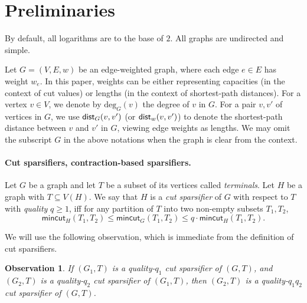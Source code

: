 \documentclass[11pt]{article}
\newtheorem{lemma}[theorem]{Lemma}
\newtheorem{observation}[theorem]{Observation}
\theoremstyle{definition}
\newcommand{\dist}{\textnormal{\textsf{dist}}}
\def\deg{\textrm{deg}}
\def\pr#1{\mathrm{Pr}\left[ #1 \right]}
\def\ex#1{{\mathbb{E}}\left[ #1 \right]}
\newcounter{note}
\newcommand{\mc}{\mathsf{mincut}}
\begin{document}
 

\section{Preliminaries}
\label{sec: prelim}

By default, all logarithms are to the base of $2$. 
All graphs are undirected and simple.

Let $G=(V,E,w)$ be an edge-weighted graph, where each edge $e\in E$ has weight $w_e$. 
In this paper, weights can be either representing capacities (in the context of cut values) or lengths (in the context of shortest-path distances).
For a vertex $v\in V$, we denote by $\deg_G(v)$ the degree of $v$ in $G$.
For a pair $v,v'$ of vertices in $G$, we use $\dist_{G}(v,v')$ (or $\dist_{w}(v,v')$) to denote the shortest-path distance between $v$ and $v'$ in $G$, viewing edge weights as lengths.
We may omit the subscript $G$ in the above notations when the graph is clear from the context.

\paragraph{Cut sparsifiers, contraction-based sparsifiers.}
Let $G$ be a graph and let $T$ be a subset of its vertices called \emph{terminals}. 
Let $H$ be a graph with $T\subseteq V(H)$. We say that $H$ is a \emph{cut sparsifier} of $G$ with respect to $T$ with \emph{quality} $q\ge 1$, iff for any partition of $T$ into two non-empty subsets $T_1,T_2$, 
\[\mc_H(T_1,T_2)\le \mc_G(T_1,T_2)\le q\cdot\mc_H(T_1,T_2).\]


We will use the following observation, which is immediate from the definition of cut sparsifiers.
\begin{observation}
\label{obs: chain}
If $(G_1,T)$ is a quality-$q_1$ cut sparsifier of $(G,T)$, and $(G_2,T)$ is a quality-$q_2$ cut sparsifier of $(G_1,T)$, then $(G_2,T)$ is a quality-$q_1q_2$ cut sparsifier of $(G,T)$.
\end{observation}
\end{document}
